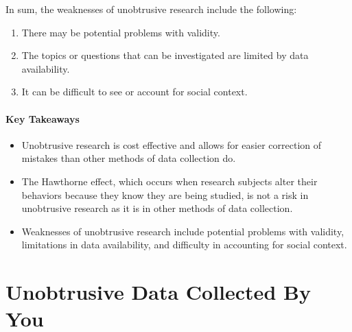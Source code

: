 In sum, the weaknesses of unobtrusive research include the following:

\begin{enumerate}
	\item There may be potential problems with validity.
	\item The topics or questions that can be investigated are limited by data availability.
	\item It can be difficult to see or account for social context.
\end{enumerate}

\paragraph{Key Takeaways}

\begin{itemize}
	\setlength{\itemsep}{0pt}
	\setlength{\parskip}{0pt}
	\setlength{\parsep}{0pt}
	
	\item Unobtrusive research is cost effective and allows for easier correction of mistakes than other methods of data collection do.
	\item The Hawthorne effect, which occurs when research subjects alter their behaviors because they know they are being studied, is not a risk in unobtrusive research as it is in other methods of data collection.
	\item Weaknesses of unobtrusive research include potential problems with validity, limitations in data availability, and difficulty in accounting for social context.
	
\end{itemize}

\section{Unobtrusive Data Collected By You}

